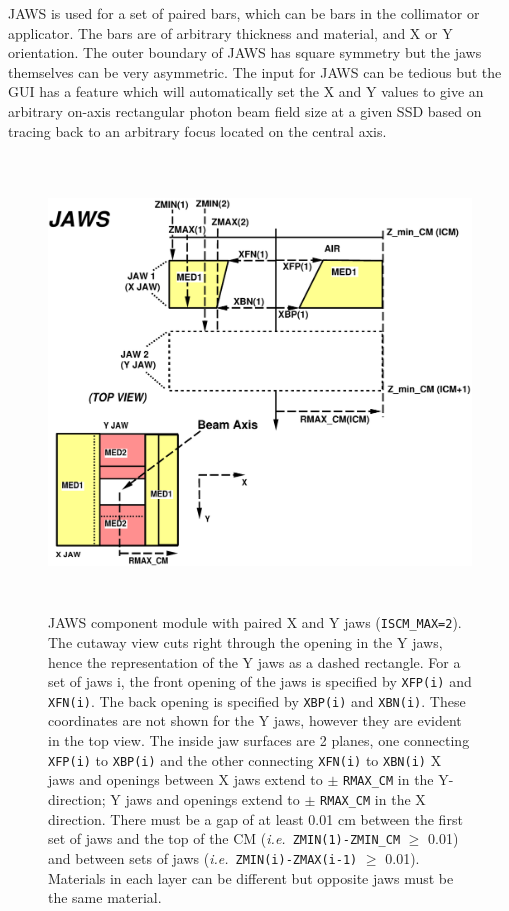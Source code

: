 \documentclass[12pt,twoside]{article}
\newcommand{\ie}{{\em i.e.}}
\begin{document}
JAWS is used for a set of paired bars, which can be bars in the collimator or
applicator. The bars are of arbitrary thickness and material, and X or Y
orientation.  The outer boundary of JAWS has square symmetry but the jaws
themselves can be very asymmetric. The input for JAWS can be tedious
but the GUI has a feature which will automatically set the X and Y values
to give an arbitrary on-axis rectangular photon beam field size at a
given SSD based on tracing back to an arbitrary focus located on the
central axis.

\begin{figure}[htbp]
\label{fig_JAWSD}
\begin{center}
\leavevmode
\includegraphics[height=12cm]{figures/jaws-both}
\end{center}
\caption[JAWS CM geometry]
{JAWS component module with paired X
and Y jaws ({\tt ISCM\_MAX=2}).  The cutaway view cuts right through the
opening in the Y jaws, hence the representation of the Y jaws as a dashed
rectangle.  For a set of jaws i, the front opening of the jaws
is specified by {\tt XFP(i)} and {\tt XFN(i)}.
The back opening is specified by
{\tt XBP(i)} and {\tt XBN(i)}.
These coordinates are not shown for the Y jaws,
however they are evident in the top view.  The inside jaw surfaces are 2 planes,
one connecting
{\tt XFP(i)} to {\tt XBP(i)} and the other connecting {\tt XFN(i)}
to {\tt XBN(i)}  X jaws and
openings between X jaws extend
to $\pm$ {\tt RMAX\_CM} in the Y-direction; Y jaws and openings extend
to $\pm$ {\tt RMAX\_CM} in the X
direction.  There must be a gap of at least 0.01 cm between the first
set of jaws and the top of the CM (\ie\ {\tt ZMIN(1)-ZMIN\_CM} $\geq$ 0.01) and
between sets of jaws (\ie\ {\tt ZMIN(i)-ZMAX(i-1)} $\geq$ 0.01).
Materials in each layer can be different but opposite jaws must be the
same material.}
\end{figure}
\end{document}

